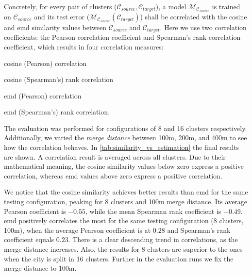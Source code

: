 	Concretely, for every pair of clusters ($\mathcal{C}_{source}, \mathcal{C}_{target}$), a model $\mathcal{M}_{\mathcal{C}_{source}}$ is trained on $\mathcal{C}_{source}$ and its test error ($\mathcal{M}_{\mathcal{C}_{source}}(\mathcal{C}_{target})$) shall be correlated with the cosine and emd similarity values between $\mathcal{C}_{source}$ and $\mathcal{C}_{target}$. Here we use two correlation coefficients: the Pearson correlation coefficient and Spearman's rank correlation coefficient, which results in four correlation measures: 
	\begin{romanlist}
		\item	cosine (Pearson) correlation
		\item 	cosine (Spearman's) rank correlation
		\item 	emd (Pearson) correlation
		\item 	emd (Spearman's) rank correlation. 
	\end{romanlist}
	The evaluation was performed for configurations of 8 and 16 clusters respectively. Additionally, we varied the \textit{merge distance} between 100m, 200m, and 400m to see how the correlation behaves. In \cref{tab:similarity_vs_estimation} the final results are shown. A correlation result is averaged across all clusters. Due to their mathematical meaning, the cosine similarity values below zero express a positive correlation, whereas emd values above zero express a positive correlation. 
	
	We notice that the cosine similarity achieves better results than emd for the same testing configuration, peaking for 8 clusters and 100m merge distance. Its average Pearson coefficient is $-0.55$, while the mean Spearman rank coefficient is $-0.49$. emd positively correlates the most for the same testing configuration (8 clusters, 100m), when the average Pearson coefficient is at $0.28$ and Spearman's rank coefficient equals $0.23$. There is a clear descending trend in correlations, as the merge distance increases.  Also, the results for 8 clusters are superior to the ones when the city is split in 16 clusters. Further in the evaluation runs we fix the merge distance to 100m.
	
